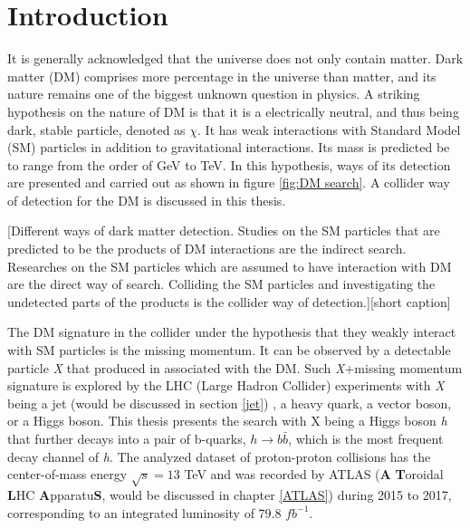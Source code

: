 \documentclass[class=NCU_thesis, crop=false]{standalone}
\begin{document}
	
	
\chapter{Introduction}
	It is generally acknowledged that the universe does not only contain matter. Dark matter (DM) \cite{hep-ph/0404175} comprises more percentage in the universe than matter, and its nature remains one of the biggest unknown question in physics. A striking hypothesis on the nature of DM \cite{STEIGMAN1985375} \cite{ PhysRevD.33.1585} is that it is a electrically neutral, and thus being dark, stable particle, denoted as $\chi$. It has weak interactions with Standard Model (SM) particles in addition to gravitational interactions. Its mass is predicted be to range from the order of GeV to TeV. In this hypothesis, ways of its detection are presented and carried out as shown in figure \ref{fig:DM search}. A collider way of detection for the DM \cite{1507.00966} is discussed in this thesis.
	
	[Different ways of dark matter detection. Studies on the SM particles that are predicted to be the products of DM interactions are the indirect search. Researches on the SM particles which are assumed to have interaction with DM are the direct way of search. Colliding the SM particles and investigating the undetected parts of the products is the collider way of detection.][short caption]
	
	\newpage
	
	The DM signature in the collider under the hypothesis that they weakly interact with SM particles is the missing momentum. It can be observed by a detectable particle \textit{X} that produced in associated with the DM. Such \textit{X}+missing momentum signature is explored by the LHC (Large Hadron Collider) experiments with \textit{X} being a jet (would be discussed in section \ref{jet}) \cite{1711.03301}, a heavy quark, a vector boson, or a Higgs boson. This thesis presents the search with X being a Higgs boson \textit{h} that further decays into a pair of b-quarks, $h \rightarrow b\bar{b}$, which is the most frequent decay channel of \textit{h}. The analyzed dataset of proton-proton collisions has the center-of-mass energy $\sqrt{s} = 13$ TeV and was recorded by ATLAS (\textbf{A} \textbf{T}oroidal \textbf{L}HC \textbf{A}pparatu\textbf{S}, would be discussed in chapter \ref{ATLAS}) during 2015 to 2017, corresponding to an integrated luminosity of 79.8 $fb^{-1}$.
	
\end{document}
